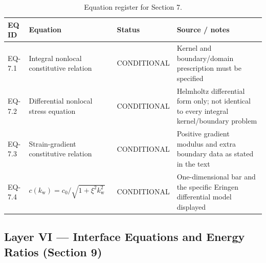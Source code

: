 \begin{table}[htbp]
\centering
\small
\caption{Equation register for Section 7.}
\label{tab:appA-sec7}
\begin{tabularx}{\textwidth}{@{}p{1.6cm}Y p{2.8cm}Y@{}}
\toprule
\textbf{EQ ID} & \textbf{Equation} & \textbf{Status} & \textbf{Source / notes} \\
\midrule
EQ-7.1 & Integral nonlocal constitutive relation & CONDITIONAL & Kernel and boundary/domain prescription must be specified \\
EQ-7.2 & Differential nonlocal stress equation & CONDITIONAL & Helmholtz differential form only; not identical to every integral kernel/boundary problem \\
EQ-7.3 & Strain-gradient constitutive relation & CONDITIONAL & Positive gradient modulus and extra boundary data as stated in the text \\
EQ-7.4 & $c(k_{\mathrm w})=c_0/\sqrt{1+\xi^2k_{\mathrm w}^2}$ & CONDITIONAL & One-dimensional bar and the specific Eringen differential model displayed \\
\bottomrule
\end{tabularx}
\end{table}

\subsection{Layer VI — Interface Equations and Energy Ratios (Section 9)}

